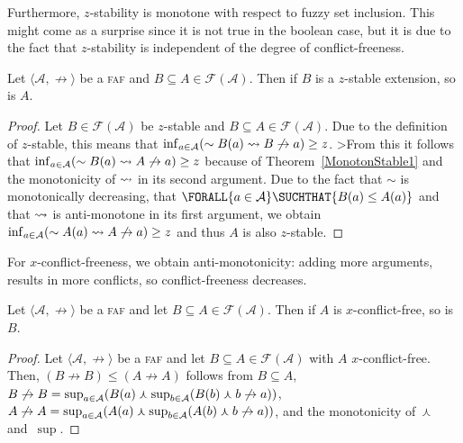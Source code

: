 \documentclass[12pt,a4paper]{article}
\newcommand{\Forall}[2]{\ensuremath{\FORALL{#1} \SUCHTHAT {#2}}}
\newcommand{\mc}[1]{\ensuremath{\mathcal{#1}}}
\newcommand{\abfaf}{\textsc{faf}}
\newcommand{\attack}{\ensuremath{\not\rightarrow}}
\newcommand{\af}[2]{\ensuremath{\langle{#1},{#2}\rangle}}
\newcommand{\Fuzzy}[1]{\ensuremath{\mc{F}({#1})}}
\newcommand{\fand}{\ensuremath{\curlywedge}}
\newcommand{\fneg}{\ensuremath{\sim}}
\begin{document}
Furthermore, $z$-stability is
monotone with respect to fuzzy set inclusion. This might come as a
surprise since it is not true in the boolean case, but it is due to
the fact that $z$-stability is independent of the degree of
conflict-freeness.


\begin{theorem}\label{stable-is-monotone}
Let \af{\mc{A}}{\attack} be a \abfaf{} and $B\subseteq A \in \Fuzzy{\mc{A}}$.
Then if $B$ is a $z$-stable extension, so is $A$.
\end{theorem}
\begin{proof}
Let $B\in\Fuzzy{\mc{A}}$ be $z$-stable and $B \subseteq
A\in\Fuzzy{\mc{A}}$. Due to the definition of $z$-stable,
this means that $\infof{a \in \mc{A}}{\fneg B(a) \fimp B \attack a} \geq z$.
>From this it follows that $\infof{a \in \mc{A}}{\fneg B(a) \fimp A \attack a} \geq z$
because of Theorem~\ref{MonotonStable1} and the monotonicity of $\rightsquigarrow$ in its second argument.
Due to the fact that $\fneg$ is monotonically decreasing, that 
$\Forall{a \in \mc{A}}{B(a) \leq A(a)}$ and
that $\rightsquigarrow$ is anti-monotone in its first argument, 
we obtain $\infof{a \in \mc{A}}{\fneg A(a) \fimp A \attack a} \geq z$
and thus $A$ is also $z$-stable.
\end{proof}

For $x$-conflict-freeness, we obtain
anti-monotonicity: adding more arguments, results in more conflicts,
so conflict-freeness decreases.

\begin{theorem}\label{AntiMonConflictFree}
Let \af{\mc{A}}{\attack} be a \abfaf{} and let $B\subseteq A \in \Fuzzy{\mc{A}}$.
Then if $A$ is $x$-conflict-free, so is $B$.
\end{theorem}
\begin{proof}
Let \af{\mc{A}}{\attack} be a \abfaf{} and let $B\subseteq A \in
\Fuzzy{\mc{A}}$ with $A$ $x$-conflict-free.
Then, $(B\attack B) \leq (A \attack A)$ follows from $B\subseteq A$,\\
$B\attack B=\suprof{a\in\mc{A}}{B(a) \fand \suprof{b\in\mc{A}}{B(b) \fand b \attack a}}$,\\
$A\attack A=\suprof{a\in\mc{A}}{A(a) \fand \suprof{b\in\mc{A}}{A(b) \fand b \attack a}}$,
and the monotonicity of~$\fand$ and~$\sup$.
\end{proof}

%
%
\end{document}
